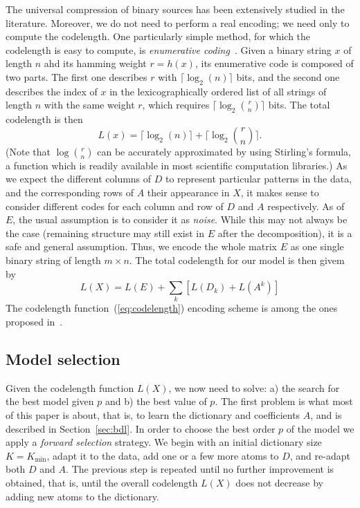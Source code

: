 \documentclass[twocolumn]{IEEEtran}
\theoremstyle{definition}
\newcommand{\refeq}[1]{(\ref{#1})}
\begin{document}
The universal compression of binary sources has been extensively studied in the literature. Moreover, we do not need to perform a real encoding; we need only to compute the codelength. One particularly simple method, for which the codelength is easy to compute, is \emph{enumerative coding}~\cite{enum}. Given a binary string $x$ of length $n$ ahd its hamming weight $r=h(x)$, its enumerative code is composed of two parts. The first one describes $r$ with $\lceil\log_2(n)\rceil$ bits, and the second one describes the index of $x$ in the lexicographically ordered list of all strings of length $n$ with the same weight $r$, which requires $\lceil\log_2{r \choose n}\rceil$ bits. The total codelength is then $$L(x) = \lceil\log_2(n)\rceil + \lceil\log_2{r \choose n}\rceil.$$ (Note that $\log{r \choose n}$ can be accurately approximated by using Stirling's formula, a function which is readily available in most scientific computation libraries.)
As we expect the different columns of $D$ to represent particular patterns in the data, and the corresponding rows of $A$ their appearance in $X$, it makes sense to consider different codes for each column and row of $D$ and $A$ respectively. As of $E$, the usual assumption is to consider it as \emph{noise}. While this may not always be the case (remaining structure may still exist in $E$ after the decomposition), it is a safe and general assumption. Thus, we encode the whole matrix $E$ as one single binary string of length $m{\times}n$. The total codelength for our model is then givem by
\begin{equation}
L(X) = L(E) + \sum_k [ L(D_k) + L(A^k) ] 
\label{eq:codelength}
\end{equation} 
The codelength function~\refeq{eq:codelength} encoding scheme is among the ones proposed in~\cite{bmf-mdl}.

\subsection{Model selection}

Given the codelength function $L(X)$, we now need to solve: a) the search for the best model given $p$ and b) the best value of $p$. The first problem is what most of this paper is about, that is, to learn the dictionary and coefficients $A$, and is described in Section~\ref{sec:bdl}. In order to choose the best order $p$ of the model we apply a \emph{forward selection} strategy. We begin with an initial dictionary size $K=K_{\min}$, adapt it to the data, add one or a few more atoms to $D$, and re-adapt both $D$ and $A$. The previous step is repeated until no further improvement is obtained, that is, until the overall codelength $L(X)$ does not decrease by adding new atoms to the dictionary.
\end{document}
